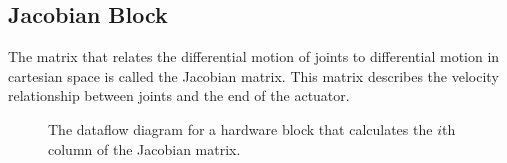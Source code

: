 \subsection{Jacobian Block}

The matrix that relates the differential motion of joints to differential motion in cartesian space is called the Jacobian matrix. This matrix describes the velocity relationship between joints and the end of the actuator.\cite{jacobian}

\begin{figure}[ht]
\center
{}
\caption{The dataflow diagram for a hardware block that calculates the $i$th column of the Jacobian matrix.}
\label{fig:jacobian}
\end{figure}
